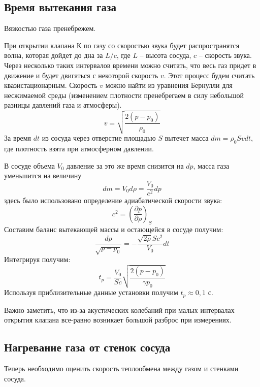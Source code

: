 \documentclass[a4paper,12pt]{report}
\begin{document}
\begin{multicols}{2}
    \subsection*{Время вытекания газа}
    Вязкостью газа пренебрежем.

    При открытии клапана К по газу со скоростью звука будет распространятся волна, которая дойдет до дна за $L/c$, где $L$ -- высота сосуда, $c$ -- скорость звука. Через несколько таких интервалов времени можно считать, что весь газ придет в движение и будет двигаться с некоторой скорость $v$. Этот процесс будем считать квазистационарным. Скорость $v$ можно найти из уравнения Бернулли для несжимаемой среды (изменением плотности пренебрегаем в силу небольшой разницы давлений газа и атмосферы).
    \begin{equation}
        \label{v}
        v=\sqrt{\frac{2(p-p_0)}{\rho_0}}
    \end{equation}
    За время $dt$ из сосуда через отверстие площадью $S$ вытечет масса $dm=\rho_0 S vdt$, где плотность взята при атмосферном давлении.

    В сосуде объема $V_0$ давление за это же время снизится на $dp$, масса газа уменьшится на величину
    \begin{equation*}
        dm=V_0d\rho=\frac{V_0}{c^2}dp
    \end{equation*}
    здесь было использовано определение адиабатической скорости звука:
    \begin{equation*}
        c^2=\left(\frac{\partial p}{\partial \rho}\right)_S
    \end{equation*}
    Составим баланс вытекающей массы и остающейся в сосуде получим:
    \begin{equation*}
        \frac{dp}{\sqrt{p-p_0}}=-\frac{\sqrt{2\rho}Sc^2}{V_0}dt
    \end{equation*}
    Интегрируя получим:
    \begin{equation}
        \label{t_p}
        t_p=\frac{V_0}{Sc}\sqrt{\frac{2(p-p_0)}{\gamma p_0}}
    \end{equation}
    Используя приблизительные данные установки получим $t_p\approx 0,1$ с.

    Важно заметить, что из-за акустических колебаний при малых интервалах открытия клапана все-равно возникает большой разброс при измерениях. 

    \subsection*{Нагревание газа от стенок сосуда} Теперь необходимо оценить скорость теплообмена между газом и стенками сосуда.


\end{multicols}
\end{document}
